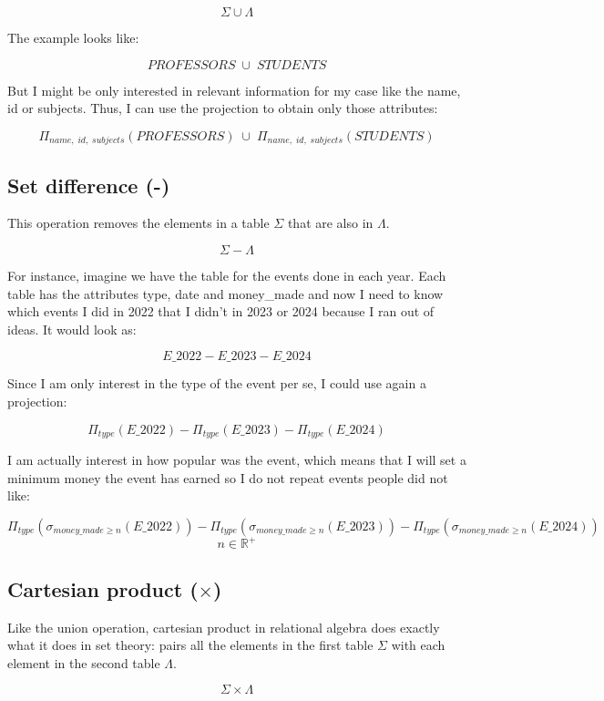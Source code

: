 \documentclass[12pt]{article}
\begin{document}
\[
    \Sigma \cup \Lambda
\]

The example looks like:

\[
    PROFESSORS \;\cup\; STUDENTS
\]

But I might be only interested in relevant information for my case like the name, id or subjects. Thus, I can use the projection to obtain only those attributes:

\[
    \Pi_{name,\; id,\; subjects}(PROFESSORS) \;\cup\; \Pi_{name,\; id,\; subjects}(STUDENTS)
\]

\subsection{Set difference (-)}

This operation removes the elements in a table \(\Sigma\) that are also in \(\Lambda\).

\[
    \Sigma - \Lambda
\]

For instance, imagine we have the table for the events done in each year. Each table has the attributes type, date and money\_made and now I need to know which events I did in 2022 that I didn't in 2023 or 2024 because I ran out of ideas. It would look as:

\[
    E\_2022 - E\_2023 - E\_2024
\]

Since I am only interest in the type of the event per se, I could use again a projection:

\[
    \Pi_{type}(E\_2022) - \Pi_{type}(E\_2023) - \Pi_{type}(E\_2024)
\]

I am actually interest in how popular was the event, which means that I will set a minimum money the event has earned so I do not repeat events people did not like:

\[
    \Pi_{type}(\sigma_{money\_made \geq n}(E\_2022)) - \Pi_{type}(\sigma_{money\_made \geq n}(E\_2023)) - \Pi_{type}(\sigma_{money\_made \geq n}(E\_2024))
\]
\[
    n \in \mathbb{R}^+
\]

\subsection{Cartesian product (\( \times \))}

Like the union operation, cartesian product in relational algebra does exactly what it does in set theory: pairs all the elements in the first table \(\Sigma\) with each element in the second table \(\Lambda\).

\[
    \Sigma \times \Lambda
\]
\end{document}
